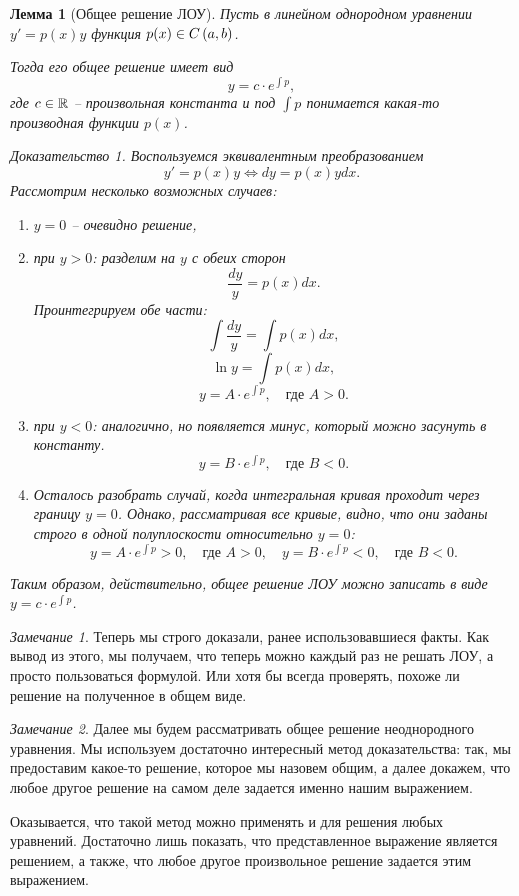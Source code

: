\documentclass[a5paper, 10pt]{article}
\theoremstyle{definition}
\theoremstyle{plain}
\newtheorem{Lem}{Лемма}
\theoremstyle{remark}
\newtheorem*{Note}{Замечание}
\newtheorem*{Proof}{Доказательство}
\begin{document}
	\begin{Lem}[Общее решение ЛОУ]
		Пусть в линейном однородном уравнении $y' = p(x) y$ функция $p(x) \in C\left(a,b\right)$.
		
		Тогда его общее решение имеет вид \begin{equation}
			y = c\cdot e^{\int\!p},
		\end{equation}
		где $c\in \mathbb{R}$ -- произвольная константа и под $\int \!p$ понимается какая-то производная функции $p(x)$.
		\begin{Proof}
			Воспользуемся эквивалентным преобразованием
			\[
			y'=p(x)y \Leftrightarrow dy = p(x) y dx.
			\]
			Рассмотрим несколько возможных случаев:
			\begin{enumerate}
				\item $y=0$ -- очевидно решение,
				\item при $y>0$: разделим на $y$ с обеих сторон
				\[
				\frac{dy}{y} = p(x) dx.
				\]
				Проинтегрируем обе части:
				\[
				\int \frac{dy}{y} = \int p(x) dx,
				\]				
				\[
				\ln y = \int p(x) dx,
				\]
				\[
				y = A\cdot e^{\int\!p}, \quad\text{где } A>0.
				\]
				\item при $y<0$: аналогично, но появляется минус, который можно засунуть в константу.
				\[
				y = B\cdot e^{\int\!p}, \quad\text{где } B<0.
				\]
				\item Осталось разобрать случай, когда интегральная кривая проходит через границу $y=0$. Однако, рассматривая все кривые, видно, что они заданы строго в одной полуплоскости относительно $y=0$:
				\[
				y = A\cdot e^{\int\!p} > 0, \quad\text{где } A>0, \quad y = B\cdot e^{\int\!p} < 0, \quad\text{где } B<0.
				\]
			\end{enumerate}
			Таким образом, действительно, общее решение ЛОУ можно записать в виде $	y = c\cdot e^{\int\!p}$.
		\end{Proof}
	\end{Lem}
	\begin{Note}
		Теперь мы строго доказали, ранее использовавшиеся факты. Как вывод из этого, мы получаем, что теперь можно каждый раз не решать ЛОУ, а просто пользоваться формулой. Или хотя бы всегда проверять, похоже ли решение на полученное в общем виде.
	\end{Note}
	\begin{Note}
		Далее мы будем рассматривать общее решение неоднородного уравнения. Мы используем достаточно интересный метод доказательства: так, мы предоставим какое-то решение, которое мы назовем общим, а далее докажем, что любое другое решение на самом деле задается именно нашим выражением. 
		
		Оказывается, что такой метод можно применять и для решения любых уравнений. Достаточно лишь показать, что представленное выражение является решением, а также, что любое другое произвольное решение задается этим выражением.
	\end{Note}
\end{document}
